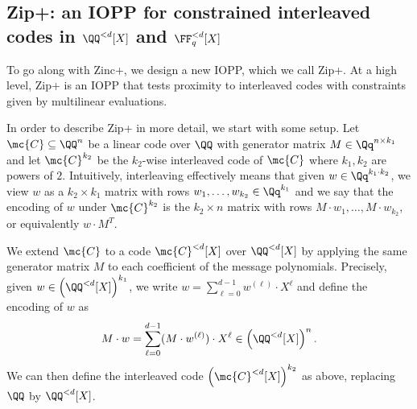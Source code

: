 \subsection{Zip+: an IOPP for constrained interleaved codes in $\QQ^{<d}[X]$ and $\FF_q^{<d}[X]$}
\label{sec:crypto_zip}


To go along with Zinc+, we design a new IOPP, which we call Zip+. At a high level, Zip+ is an IOPP that tests proximity to interleaved codes with constraints given by multilinear evaluations.

In order to describe Zip+ in more detail, we start with some setup. Let $\mc{C}\subseteq \QQ^n$ be a linear code over $\QQ$ with generator matrix $M \in \Qq^{n \times k_1}$ and let $\mc{C}^{k_2}$ be the $k_2$-wise interleaved code of $\mc{C}$ where $k_1, k_2$ are powers of $2$. Intuitively, interleaving effectively means that given $w \in \Qq^{k_1 \cdot k_2}$, we view $w$ as a $k_2 \times k_1$ matrix with rows $w_1, \ldots, w_{k_2} \in \Qq^{k_1}$ and we say that the encoding of $w$ under $\mc{C}^{k_2}$ is the $k_2 \times n$ matrix with rows $M\cdot w_1, \ldots, M \cdot w_{k_2}$, or equivalently $w\cdot M^T$.

We extend $\mc{C}$ to a code $\mc{C}^{<d}[X]$ over $\QQ^{<d}[X]$ by applying the same generator matrix $M$ to each coefficient of the message polynomials. Precisely, given $w \in \left(\QQ^{<d}[X]\right)^{k_1}$, we write $w = \sum_{\ell=0}^{d-1} w^{(\ell)}\cdot X^\ell$ and define the encoding of $w$ as $$M\cdot w = \sum_{\ell=0}^{d-1} (M\cdot w^{(\ell)}) \cdot X^\ell \in \left(\QQ^{<d}[X]\right)^{n}.$$  We can then define the interleaved code $\left(\mc{C}^{<d}[X]\right)^{k_2}$ as above, replacing $\QQ$ by $\QQ^{<d}[X]$.

